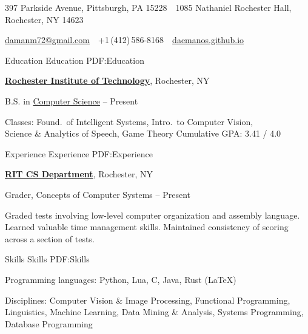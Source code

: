 \documentclass[letterpaper,MMMyyyy,nonstopmode]{simpleresumecv}
\newcommand{\CVAuthor}{Daman Morris}
\newcommand{\CVWebpage}{daemanos.github.io}
\begin{document}

\Title{\CVAuthor}

\begin{SubTitle}
397 Parkside Avenue, Pittsburgh, PA 15228
\,\SubBulletSymbol\,
1085 Nathaniel Rochester Hall, Rochester, NY 14623
\par
\href{mailto:damanm72@gmail.com}
{damanm72@gmail.com}
\,\SubBulletSymbol\,
+1\,(412)\,586-8168
\,\SubBulletSymbol\,
\href{\CVWebpage}
{\url{\CVWebpage}}
\end{SubTitle}

\begin{Body}


\Section
{Education}
{Education}
{PDF:Education}

\Entry
\href{http://www.rit.edu}
{\textbf{Rochester Institute of Technology}},
Rochester, NY

\Gap
\BulletItem
B.S. in
\href{http://cs.rit.edu}
{Computer Science}
\hfill
{} --
Present
\begin{Detail}
\SubBulletItem
Classes:
Found.\ of Intelligent Systems, Intro.\ to Computer Vision, \\
Science \& Analytics of Speech, Game Theory
\SubBulletItem
Cumulative GPA: 3.41 / 4.0
\end{Detail}


\Section
{Experience}
{Experience}
{PDF:Experience}

\Entry
\href{http://cs.rit.edu}
{\textbf{RIT CS Department}},
Rochester, NY

\Gap
\BulletItem
Grader,
Concepts of Computer Systems
\hfill
{} --
Present
\begin{Detail}
\SubBulletItem
Graded tests involving low-level computer organization and assembly language.
\SubBulletItem
Learned valuable time management skills.
\SubBulletItem
Maintained consistency of scoring across a section of tests.
\end{Detail}


\Section
{Skills}
{Skills}
{PDF:Skills}

\BulletItem
Programming languages:
Python,
Lua,
C,
Java,
Rust
(\LaTeX)

\BulletItem
Disciplines:
Computer Vision \& Image Processing,
Functional Programming, %
Linguistics,
Machine Learning,
Data Mining \& Analysis,
Systems Programming,
Database Programming


\end{Body}
\end{document}

